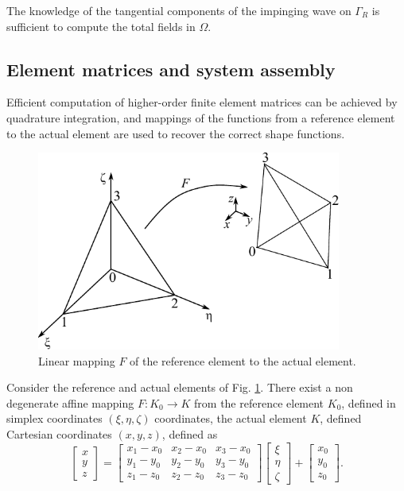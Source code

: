 \noindent The knowledge of the tangential components of the impinging wave on $\Gamma_R$ is sufficient to compute the total fields in $\Omega$. 


\subsection{Element matrices and system assembly}

Efficient computation \cite{rognes2009efficient} of higher-order finite element matrices can be achieved by quadrature integration, and  mappings of the functions from a reference element to the actual element are used to recover the correct shape functions.

\begin{figure}[h!]
\centering
\includegraphics[width=10cm]{MappingTet}
\caption{Linear mapping $F$ of the reference element to the actual element.}
\label{fig:MappingTet}
\end{figure}

Consider the reference and actual elements of Fig. \ref{fig:MappingTet}. There exist a non degenerate affine mapping $F : K_0 \rightarrow K$ from the reference element $K_0$, defined in simplex coordinates $(\xi, \eta, \zeta)$ coordinates, the actual element $K$, defined Cartesian coordinates $(x,y,z)$, defined as
\begin{equation}
\label{eq:mapping}
\begin{bmatrix}
x\\y\\z
\end{bmatrix}
=
\begin{bmatrix}
x_1-x_0 & x_2-x_0 & x_3-x_0\\
y_1-y_0 & y_2-y_0 & y_3-y_0\\
z_1-z_0 & z_2-z_0 & z_3-z_0
\end{bmatrix}
\begin{bmatrix}
\xi \\ \eta \\ \zeta
\end{bmatrix}
+
\begin{bmatrix}
x_0\\
y_0\\
z_0
\end{bmatrix}.
\end{equation}


